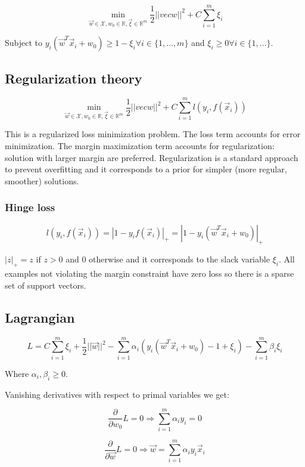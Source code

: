 	$$\min\limits_{\vec{w}\in\mathcal{X}, w_0\in\mathbb{R},\vec{\xi}\in\mathbb{R}^m}\frac{1}{2}||vec{w}||^2+C\sum\limits_{i=1}^m\xi_i$$

	Subject to $y_i(\vec{w}^T\vec{x}_i+w_0)\ge 1-\xi_i\forall i\in\{1, \dots, m\}$ and $\xi_i\ge 0\forall i\in\{1, \dots\}$.

	\subsection{Regularization theory}

	$$\min\limits_{\vec{w}\in\mathcal{X}, w_0\in\mathbb{R},\vec{\xi}\in\mathbb{R}^m}\frac{1}{2}||vec{w}||^2+C\sum\limits_{i=1}^ml(y_i, f(\vec{x}_i))$$

	This is a regularized loss minimization problem.
	The loss term accounts for error minimization.
	The margin maximization term accounts for regularization: solution with larger margin are preferred.
	Regularization is a standard approach to prevent overfitting and it corresponds to a prior for simpler (more regular, smoother) solutions.

		\subsubsection{Hinge loss}

		$$l(y_i, f(\vec{x}_i)) = |1-y_if(\vec{x}_i)|_+ = |1-y_i(\vec{w}^T\vec{x}_i+w_0)|_+$$

		$|z|_+=z$ if $z>0$ and $0$ otherwise and it corresponds to the slack variable $\xi_i$.
		All examples not violating the margin constraint have zero loss so there is a sparse set of support vectors.

	\subsection{Lagrangian}

	$$L = C\sum\limits_{i=1}^m\xi_i+\frac{1}{2}||\vec{w}||^2-\sum\limits_{i=1}^m\alpha_i(y_i(\vec{w}^T\vec{x}_i+w_0)-1+\xi_i)-\sum\limits_{i=1}^m\beta_i\xi_i$$

	Where $\alpha_i, \beta_i\ge 0$.

	Vanishing derivatives with respect to primal variables we get:

	$$\frac{\partial}{\partial w_0}L = 0 \Rightarrow \sum\limits_{i=1}^m\alpha_iy_i = 0$$

	$$\frac{\partial}{\partial\vec{w}}L = 0\Rightarrow \vec{w} = \sum\limits_{i=1}^m\alpha_iy_i\vec{x}_i$$

